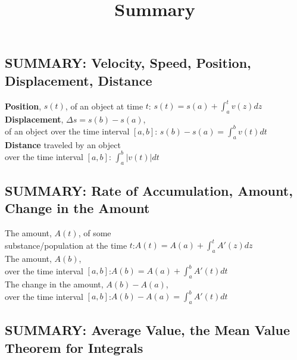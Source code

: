 \documentclass{ximera}
\title[Summary]{Summary}
\begin{document}
\begin{abstract} \end{abstract}
\maketitle

\subsection*{SUMMARY: Velocity, Speed, Position, Displacement, Distance}

\textbf{Position}, $s(t)$, of an object at time $t$:
\hspace{0.5in}$s(t)= s(a) + \displaystyle \int_{a}^{ t} v(z) dz $\\[1em]
\textbf{Displacement}, $\Delta s = s(b)-s(a)$,\\ of an object over the time interval $[a,b]$:
\hspace{0.4in}$s(b)- s(a) = \displaystyle \int_{a}^{ b} v(t) dt $\\[1em]
\textbf{Distance} traveled by an object\\ over the time interval $[a,b]$:
\hspace{1.5in}$ \displaystyle \int_{a}^{ b} |v(t)| dt $\\[3.5em]


\subsection*{SUMMARY: Rate of Accumulation, Amount, Change in the Amount}

The amount, $A(t)$, of some\\ substance/population 
 at the time $t$:\hspace{0.72in}$A(t)= A(a) + \displaystyle \int_{a}^{ t} A'(z) dz $\\[1em]
 The amount, $A(b)$,\\
over the time interval  $[a,b]$:\hspace{1.2in}$A(b)= A(a) + \displaystyle \int_{a}^{ b} A'(t) dt $\\[1em]
The change in the amount, $A(b)-A(a)$,\\
over the time interval  $[a,b]$:\hspace{1.2in}$A(b)- A(a) = \displaystyle \int_{a}^{ b} A'(t) dt $\\[3.5em]

\subsection*{SUMMARY: Average Value, the Mean Value Theorem for Integrals}
\end{document}
